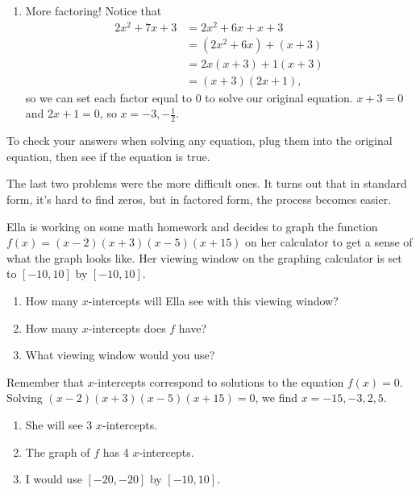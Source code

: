 \documentclass[noauthor]{ximera}
\begin{document}
\begin{problem}
\begin{explanation}
\begin{enumerate}
        \item More factoring! Notice that
        \begin{align*}
            2x^2 + 7x + 3 & = 2x^2 + 6x + x + 3 \\
            & = (2x^2 + 6x) + (x + 3) \\
            & = 2x(x + 3) + 1(x + 3) \\
            & = (x + 3)(2x + 1),
        \end{align*}
        so we can set each factor equal to 0 to solve our original equation. \(x + 3 = 0\) and \(2x + 1 = 0\), so \(x = -3, -\frac{1}{2}\).
    \end{enumerate}

To check your answers when solving any equation, plug them into the original equation, then see if the equation is true.

The last two problems were the more difficult ones. It turns out that in standard form, it's hard to find zeros, but in factored form, the process becomes easier.
\end{explanation}
\end{problem}

\begin{problem}
Ella is working on some math homework and decides to graph the 
function 
\(f\left(x\right)=\left(x-2\right)\left(x+3\right)\left(x-5\right)\left(x+15\right)\) 
on her calculator to get a sense of what the graph looks like. Her 
viewing window on the graphing calculator is set to \([-10,10]\) by \([-10,10]\). 

\begin{enumerate}
    \item How many \(x\)-intercepts will Ella see with this viewing window?
    \item How many \(x\)-intercepts does \(f\) have?
    \item What viewing window would you use?
\end{enumerate}

\begin{explanation}
Remember that \(x\)-intercepts correspond to solutions to the equation \(f(x) = 0\). 
Solving \((x - 2)(x + 3)(x - 5)(x + 15) = 0\), we find \(x = -15, -3, 2, 5\).
\begin{enumerate}
    \item She will see 3 \(x\)-intercepts.
    \item The graph of \(f\) has 4 \(x\)-intercepts.
    \item I would use \([-20, -20]\) by \([-10, 10]\).
\end{enumerate}
\end{explanation}
\end{problem}
\end{document}
